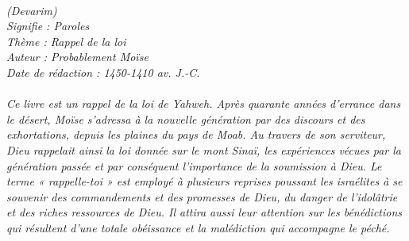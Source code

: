 \BFont
\noindent\hrulefill
{\footnotesize
\textit{
\bigskip
{\centering{}
\\(Devarim)
\\Signifie : Paroles
\\Thème : Rappel de la loi
\\Auteur : Probablement Moïse
\\Date de rédaction : 1450-1410 av. J.-C.\\}
}
\textit{
\\Ce livre est un rappel de la loi de Yahweh. Après quarante années d’errance dans le désert,  Moïse s’adressa à la nouvelle génération par des discours et des exhortations, depuis les plaines du pays de Moab. Au travers de son serviteur, Dieu rappelait ainsi la loi donnée sur le mont Sinaï, les expériences vécues par la génération passée et par conséquent l’importance de la soumission à Dieu. Le terme « rappelle-toi » est employé à plusieurs reprises poussant les israélites à se souvenir des commandements et des promesses de Dieu, du danger de l’idolâtrie et des riches ressources de Dieu. Il attira aussi leur attention sur les bénédictions qui résultent d’une totale obéissance et la malédiction qui accompagne le péché.\bigskip
}
}
\par\nobreak\noindent\hrulefill
